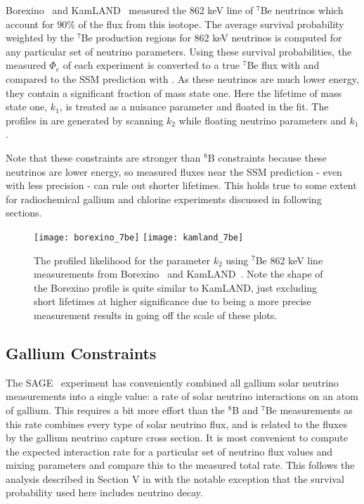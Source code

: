 Borexino~\cite{borexino7be} and KamLAND~\cite{kamland7be} measured the 862 keV line of $^7$Be neutrinos which account for $90\%$ of the flux from this isotope. 
The average survival probability weighted by the $^7$Be production regions for 862 keV neutrinos is computed for any particular set of neutrino parameters.
Using these survival probabilities, the measured $\Phi_e$ of each experiment is converted to a true $^7$Be flux with  and compared to the SSM prediction with . 
As these neutrinos are much lower energy, they contain a significant fraction of mass state one. 
Here the lifetime of mass state one, $k_1$, is treated as a nuisance parameter and floated in the fit. 
The profiles in  are generated by scanning $k_2$ while floating neutrino parameters and $k_1$.

Note that these constraints are stronger than $^8$B constraints because these neutrinos are lower energy, so measured fluxes near the SSM prediction - even with less precision - can rule out shorter lifetimes.
This holds true to some extent for radiochemical gallium and chlorine experiments discussed in following sections.

\begin{figure}
\centering
\texttt{[image: borexino\_7be]}
\texttt{[image: kamland\_7be]}
\caption{The profiled likelihood for the parameter $k_2$ using $^7$Be 862 keV line measurements from Borexino~\cite{borexino7be} and KamLAND~\cite{kamland7be}. Note the shape of the Borexino profile is quite similar to KamLAND, just excluding short lifetimes at higher significance due to being a more precise measurement results in going off the scale of these plots.}
\label{fig:7be_profiles}
\end{figure}

\subsection{Gallium Constraints}

The SAGE~\cite{sagecombo} experiment has conveniently combined all gallium solar neutrino measurements into a single value: a rate of solar neutrino interactions on an atom of gallium. 
This requires a bit more effort than the $^8$B and $^7$Be measurements as this rate combines every type of solar neutrino flux, and is related to the fluxes by the gallium neutrino capture cross section.
It is most convenient to compute the expected interaction rate for a particular set of neutrino flux values and mixing parameters and compare this to the measured total rate. 
This follows the analysis described in Section V in \cite{sagecombo} with the notable exception that the survival probability used here includes neutrino decay.

